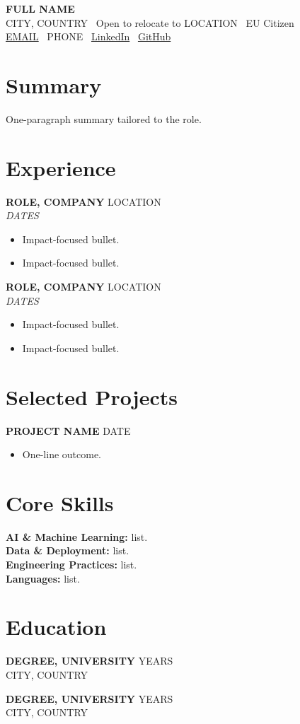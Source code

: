 \documentclass[10pt,a4paper]{article}
\begin{document}
{\LARGE \textbf{\color{emphasis}FULL NAME}}\\
CITY, COUNTRY \textbar\ Open to relocate to LOCATION \textbar\ EU Citizen\\
\href{mailto:EMAIL}{EMAIL} \textbar\ PHONE \textbar\
\href{LINKEDIN_URL}{LinkedIn} \textbar\
\href{GITHUB_URL}{GitHub}

\section*{Summary}
One-paragraph summary tailored to the role.

\section*{Experience}
\textbf{ROLE, COMPANY} \hfill LOCATION\\
\textit{DATES}
\begin{itemize}
  \item Impact-focused bullet.
  \item Impact-focused bullet.
\end{itemize}

\textbf{ROLE, COMPANY} \hfill LOCATION\\
\textit{DATES}
\begin{itemize}
  \item Impact-focused bullet.
  \item Impact-focused bullet.
\end{itemize}

\section*{Selected Projects}
\textbf{PROJECT NAME} \hfill DATE
\begin{itemize}
  \item One-line outcome.
\end{itemize}

\section*{Core Skills}
\textbf{AI \& Machine Learning:} list.\\
\textbf{Data \& Deployment:} list.\\
\textbf{Engineering Practices:} list.\\
\textbf{Languages:} list.

\section*{Education}
\textbf{DEGREE, UNIVERSITY} \hfill YEARS\\
CITY, COUNTRY

\textbf{DEGREE, UNIVERSITY} \hfill YEARS\\
CITY, COUNTRY
\end{document}
